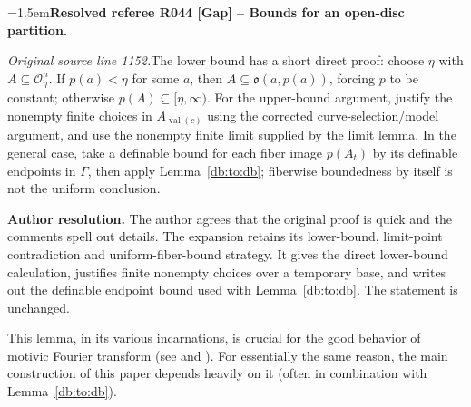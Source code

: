 \documentclass[12pt]{amsart}
\newcommand{\ResolvedRefereeRemark}[5]{%
  \par\medskip\begingroup\normalfont\small\color{gray}%
  \emergencystretch=1.5em\noindent\textbf{Resolved referee R#1 [#2] -- #3.}\par\nobreak\noindent #4\par
  \medskip\color{ResolutionGreen}\noindent\textbf{Author resolution.} #5\par
  \endgroup\medskip
}
\theoremstyle{plain}
\theoremstyle{definition}
\theoremstyle{remark}
\numberwithin{equation}{section}
\theoremstyle{plain}
\newcommand{\OO}{\mdl O}
\newcommand{\go}{\mathfrak{o}}
\newcommand{\0}{\emptyset}
\newcommand{\mdl}[1]{\mathcal{#1}}  %
\DeclareMathOperator{\vv}{val}
\begin{document}
\ResolvedRefereeRemark{044}{Gap}{Bounds for an open-disc partition}{%
\textit{Original source line 1152.}\quad The lower bound has a short direct proof: choose $\eta$ with $A\subseteq\OO_\eta^n$. If $p(a)<\eta$ for some $a$, then $A\subseteq\go(a,p(a))$, forcing $p$ to be constant; otherwise $p(A)\subseteq[\eta,\infty)$. For the upper-bound argument, justify the nonempty finite choices in $A_{\vv(c)}$ using the corrected curve-selection/model argument, and use the nonempty finite limit supplied by the limit lemma. In the general case, take a definable bound for each fiber image $p(A_t)$ by its definable endpoints in $\Gamma$, then apply Lemma~\ref{db:to:db}; fiberwise boundedness by itself is not the uniform conclusion.
}{The author agrees that the original proof is quick and the comments spell out details. The expansion retains its lower-bound, limit-point contradiction and uniform-fiber-bound strategy. It gives the direct lower-bound calculation, justifies finite nonempty choices over a temporary base, and writes out the definable endpoint bound used with Lemma~\ref{db:to:db}. The statement is unchanged.}

This lemma, in its various incarnations, is crucial for the good behavior of motivic Fourier transform (see \cite[\S~11]{hrushovski:kazhdan:integration:vf} and \cite{yin:hk:part:3}). For essentially the same reason, the  main construction of this paper depends heavily on  it (often in combination with Lemma~\ref{db:to:db}).
\end{document}
